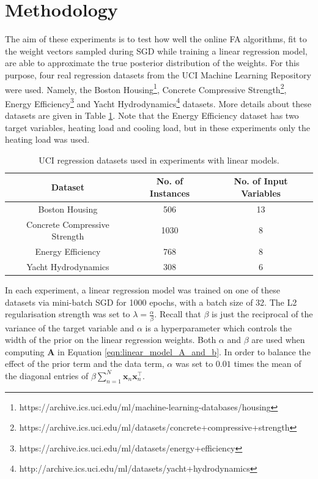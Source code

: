 \documentclass[msc,deptreport.inf]{infthesis} %
\newcommand{\matr}[1]{\mathbf{#1}}
\begin{document}
\section{Methodology}

The aim of these experiments is to test how well the online FA algorithms, fit to the weight vectors sampled during SGD while training a linear regression model, are able to approximate the true posterior distribution of the weights. For this purpose, four real regression datasets from the UCI Machine Learning Repository \cite{dua2019} were used. Namely, the Boston Housing\footnote{https://archive.ics.uci.edu/ml/machine-learning-databases/housing}, Concrete Compressive Strength\footnote{https://archive.ics.uci.edu/ml/datasets/concrete+compressive+strength}, Energy Efficiency\footnote{https://archive.ics.uci.edu/ml/datasets/energy+efficiency} and Yacht Hydrodynamics\footnote{http://archive.ics.uci.edu/ml/datasets/yacht+hydrodynamics} datasets. More details about these datasets are given in Table \ref{table:uci_datasets}. Note that the Energy Efficiency dataset has two target variables, heating load and cooling load, but in these experiments only the heating load was used. 

\begin{table}[h!]
	\begin{center}
		\begin{tabular}{||c c c ||} 
 			\hline
 			Dataset & No. of Instances & No. of Input Variables \\ [0.5ex] 
 			\hline\hline
 			Boston Housing & 506 & 13 \\ 
 			\hline
 			Concrete Compressive Strength & 1030 & 8 \\
 			\hline
 			Energy Efficiency & 768 & 8 \\
 			\hline
 			Yacht Hydrodynamics & 308 & 6 \\ [1ex] 
 			\hline
		\end{tabular}
		\caption{UCI regression datasets used in experiments with linear models.}
		\label{table:uci_datasets}
	\end{center}
\end{table}

In each experiment, a linear regression model was trained on one of these datasets via mini-batch SGD for 1000 epochs, with a batch size of 32. The L2 regularisation strength was set to $\lambda = \frac{\alpha}{\beta}$. Recall that $\beta$ is just the reciprocal of the variance of the target variable and $\alpha$ is a hyperparameter which controls the width of the prior on the linear regression weights. Both $\alpha$ and $\beta$ are used when computing $\matr{A}$ in Equation \ref{eqn:linear_model_A_and_b}. In order to balance the effect of the prior term and the data term, $\alpha$ was set to $0.01$ times the mean of the diagonal entries of $\beta \sum_{n=1}^N \matr{x}_n \matr{x}_n^\intercal$.
\end{document}
